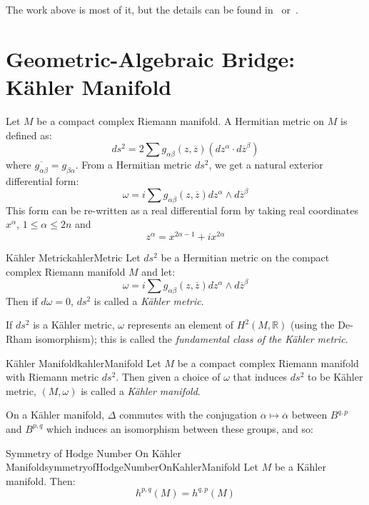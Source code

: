 \documentclass{book}
\newenvironment{Proof}[1][]
  {\begin{ProofTcb}[#1]}
  {\end{ProofTcb}}
\newcommand{\R}{{\mathbb{R}}}
\begin{document}
\begin{Proof}
  The work above is most of it, but the details can be found in~\cite{HodgeTheory2014} or~\cite{voisinHodgeTheoryComplex2002}.
\end{Proof}



\section{Geometric-Algebraic Bridge: K\"ahler Manifold}\label{sec:kahlerMan}

Let $M$ be a compact complex Riemann manifold. A Hermitian metric on $M$ is defined as:
\[
  ds^2 = 2 \sum g_{\alpha\beta}(z, \overline{z}) (dz^\alpha \cdot d \overline{z}^\beta)
\]
where $\overline{g_{\alpha\beta}} = g_{\beta\alpha}$. From a Hermitian metric $ds^2$, we get a natural exterior
differential form:
\[
  \omega = i\sum g_{\alpha\beta}(z, \overline{z}) dz^\alpha \wedge  d \overline{z}^\beta
\]
This form can be re-written as a real differential form by taking real coordinates $x^\alpha$, $1 \le \alpha
\le 2n$ and
\[
  z^\alpha = x^{2\alpha-1} + ix^{2\alpha}
\]
\begin{defn}{K\"ahler Metric}{kahlerMetric}
  Let $ds^2$ be a Hermitian metric on the compact complex Riemann manifold $M$ and let:
  \[
    \omega = i\sum g_{\alpha\beta}(z, \overline{z}) dz^\alpha \wedge  d \overline{z}^\beta
  \]
  Then if $d\omega = 0$, $ds^2$ is called a \emph{K\"ahler metric}.
\end{defn}

If $ds^2$ is a K\"ahler metric, $\omega$ represents an element of $H^2(M, \R)$ (using the De-Rham
isomorphism); this is called the \emph{fundamental class of the K\"ahler metric}.

\begin{defn}{K\"ahler Manifold}{kahlerManifold}
  Let $M$ be a compact complex Riemann manifold with Riemann metric $ds^2$. Then given a choice of $\omega$ that
  induces $ds^2$ to be K\"ahler metric, $(M, \omega)$ is called a \emph{K\"ahler manifold}.
\end{defn}

On a K\"ahler manifold, $\Delta$ commutes with the conjugation $\alpha \mapsto \overline{\alpha}$ between
$B^{q,p}$ and $B^{p,q}$ which induces an isomorphism between these groups, and so:
\begin{thm}{Symmetry of Hodge Number On K\"ahler Manifold}{symmetryofHodgeNumberOnKahlerManifold}
  Let $M$ be a K\"ahler manifold. Then:
  \[
  h^{p,q}(M) = h^{q,p}(M)
\]
\end{thm}
\end{document}
